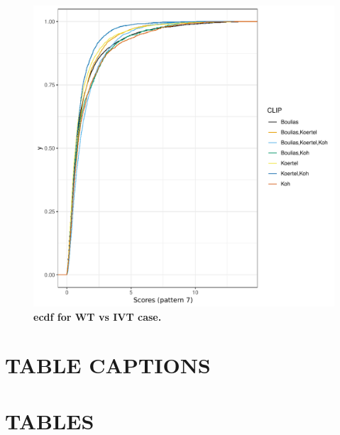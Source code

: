 \documentclass[times, 11pt, a4paper]{article}
\begin{document}
\newpage
\begin{figure}[h!]
	\includegraphics[width = 1\textwidth]{img/ecdf_WT_IVT.pdf}
	\caption{\textbf{ecdf  for WT  vs IVT case.} }
	\label{fig:ecdf_WT.IVT}
\end{figure}
\newpage
\section*{TABLE CAPTIONS}
\section*{TABLES}
\end{document}
